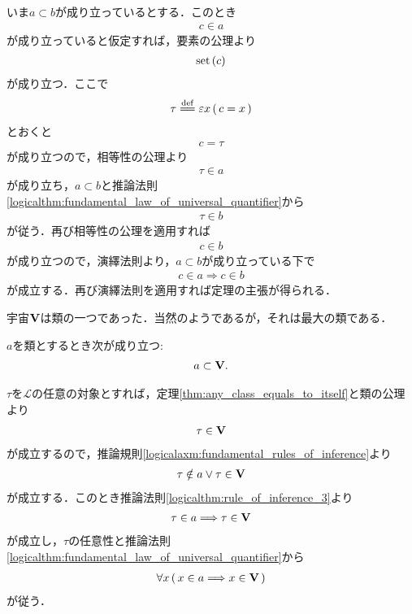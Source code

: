 	\begin{prf}	
		いま$a \subset b$が成り立っているとする．このとき
		\begin{align}
			c \in a
		\end{align}
		が成り立っていると仮定すれば，要素の公理より
		\begin{align}
			\operatorname*{set} \left(c\right)
		\end{align}
		が成り立つ．ここで
		\begin{align}
			\tau \defeq \varepsilon x\, (\, c=x\, )
		\end{align}
		とおくと
		\begin{align}
			c = \tau
		\end{align}
		が成り立つので，相等性の公理より
		\begin{align}
			\tau \in a
		\end{align}
		が成り立ち，$a \subset b$と推論法則\ref{logicalthm:fundamental_law_of_universal_quantifier}から
		\begin{align}
			\tau \in b
		\end{align}
		が従う．再び相等性の公理を適用すれば
		\begin{align}
			c \in b
		\end{align}
		が成り立つので，演繹法則より，$a \subset b$が成り立っている下で
		\begin{align}
			c \in a \Longrightarrow c \in b
		\end{align}
		が成立する．再び演繹法則を適用すれば定理の主張が得られる．
		\QED
	\end{prf}
	
	宇宙$\mathbf{V}$は類の一つであった．当然のようであるが，それは最大の類である．
	\begin{screen}
		\begin{thm}
			$a$を類とするとき次が成り立つ:
			\begin{align}
				a \subset \mathbf{V}.
			\end{align}
		\end{thm}
	\end{screen}
	
	\begin{prf}
		$\tau$を$\mathcal{L}$の任意の対象とすれば，定理\ref{thm:any_class_equals_to_itself}と類の公理より
		\begin{align}
			\tau \in \mathbf{V}
		\end{align}
		が成立するので，推論規則\ref{logicalaxm:fundamental_rules_of_inference}より
		\begin{align}
			\tau \notin a \vee \tau \in \mathbf{V}
		\end{align}
		が成立する．このとき推論法則\ref{logicalthm:rule_of_inference_3}より
		\begin{align}
			\tau \in a \Longrightarrow \tau \in \mathbf{V}
		\end{align}
		が成立し，$\tau$の任意性と推論法則\ref{logicalthm:fundamental_law_of_universal_quantifier}から
		\begin{align}
			\forall x\, (\, x \in a \Longrightarrow x \in \mathbf{V}\, )
		\end{align}
		が従う．
		\QED
	\end{prf}
	
